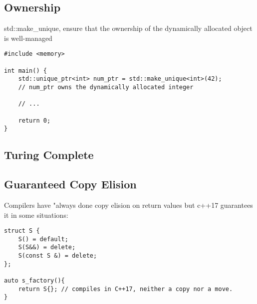 \subsection{Ownership}

std::make\_unique, ensure that the ownership of the dynamically allocated object is well-managed 


\begin{verbatim}
#include <memory>

int main() {
    std::unique_ptr<int> num_ptr = std::make_unique<int>(42);
    // num_ptr owns the dynamically allocated integer

    // ...
    
    return 0;
}
\end{verbatim}


\subsection{Turing Complete}


\subsection{Guaranteed Copy Elision}

Compilers have "always done copy elision on return values but c++17 guarantees it in some situations:

\begin{verbatim}
struct S {
    S() = default;
    S(S&&) = delete;
    S(const S &) = delete;
};

auto s_factory(){
    return S{}; // compiles in C++17, neither a copy nor a move.
}
\end{verbatim}

